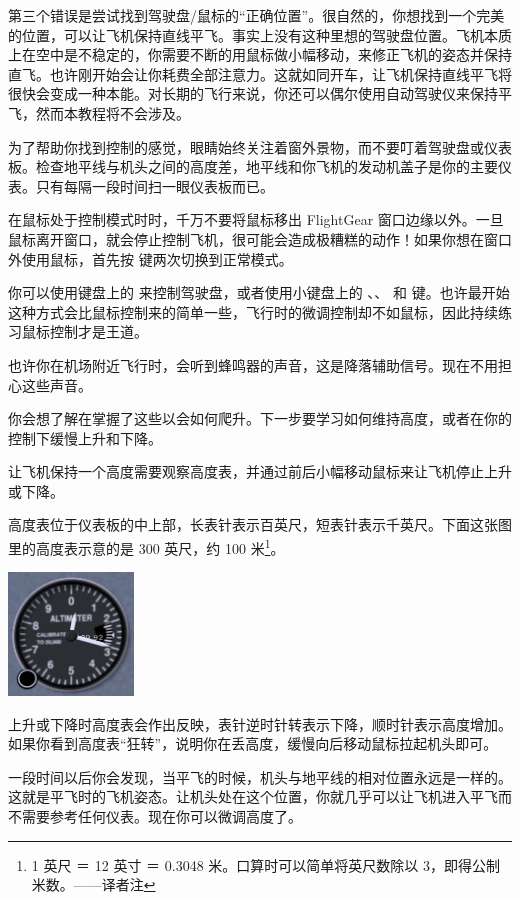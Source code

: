 第三个错误是尝试找到驾驶盘/鼠标的“正确位置”。很自然的，你想找到一个完美的位置，可以让飞机保持直线平飞。事实上没有这种里想的驾驶盘位置。飞机本质上在空中是不稳定的，你需要不断的用鼠标做小幅移动，来修正飞机的姿态并保持直飞。也许刚开始会让你耗费全部注意力。这就如同开车，让飞机保持直线平飞将很快会变成一种本能。对长期的飞行来说，你还可以偶尔使用自动驾驶仪来保持平飞，然而本教程将不会涉及。

为了帮助你找到控制的感觉，眼睛始终关注着窗外景物，而不要叮着驾驶盘或仪表板。检查地平线与机头之间的高度差，地平线和你飞机的发动机盖子是你的主要仪表。只有每隔一段时间扫一眼仪表板而已。

在鼠标处于控制模式时时，千万不要将鼠标移出 FlightGear 窗口边缘以外。一旦鼠标离开窗口，就会停止控制飞机，很可能会造成极糟糕的动作！如果你想在窗口外使用鼠标，首先按  键两次切换到正常模式。

你可以使用键盘上的  来控制驾驶盘，或者使用小键盘上的 、、 和  键。也许最开始这种方式会比鼠标控制来的简单一些，飞行时的微调控制却不如鼠标，因此持续练习鼠标控制才是王道。

也许你在机场附近飞行时，会听到蜂鸣器的声音，这是降落辅助信号。现在不用担心这些声音。

你会想了解在掌握了这些以会如何爬升。下一步要学习如何维持高度，或者在你的控制下缓慢上升和下降。

让飞机保持一个高度需要观察高度表，并通过前后小幅移动鼠标来让飞机停止上升或下降。

高度表位于仪表板的中上部，长表针表示百英尺，短表针表示千英尺。下面这张图里的高度表示意的是 300 英尺，约 100 米\footnote{1 英尺 ＝ 12 英寸 ＝ 0.3048 米。口算时可以简单将英尺数除以 3，即得公制米数。——译者注}。

\begin{center}
\includegraphics[width=0.25\textwidth]{img/tut_17}
\end{center}

上升或下降时高度表会作出反映，表针逆时针转表示下降，顺时针表示高度增加。如果你看到高度表“狂转”，说明你在丢高度，缓慢向后移动鼠标拉起机头即可。

一段时间以后你会发现，当平飞的时候，机头与地平线的相对位置永远是一样的。这就是平飞时的飞机姿态。让机头处在这个位置，你就几乎可以让飞机进入平飞而不需要参考任何仪表。现在你可以微调高度了。

